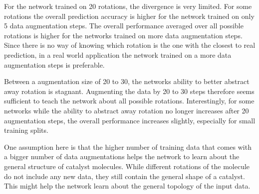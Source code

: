 For the network trained on 20 rotations, the divergence is very limited.
For some rotations the overall prediction accuracy is higher for the network trained on only 5 data augmentation steps.
The overall performance averaged over all possible rotations is higher for the networks trained on more data augmentation steps.
Since there is no way of knowing which rotation is the one with the closest to real prediction, in 
a real world application the network trained on a more data augmentation steps is preferable.

Between a augmentation size of 20 to 30, the networks ability to better abstract away rotation is stagnant.
Augmenting the data by 20 to 30 steps therefore seems sufficient to teach the network about all possible rotations.
Interestingly, for some networks while the ability to abstract away rotation no longer increases after 20 augmentation 
steps, the overall performance increases slightly, especially for small training splits.

One assumption here is that the higher number of training data that comes with a bigger number of data augmentations
helps the network to learn about the general structure of catalyst molecules.
While different rotations of the molecule do not include any new data, they still contain the 
general shape of a catalyst.
This might help the network learn about the general topology of the input data.

